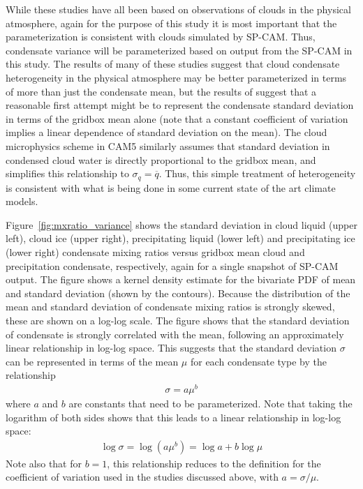While these studies have all been based on observations of clouds in the
physical atmosphere, again for the purpose of this study it is most
important that the parameterization is consistent with clouds simulated
by SP-CAM. Thus, condensate variance will be parameterized based on
output from the SP-CAM in this study. The results of many of these
studies suggest that cloud condensate heterogeneity in the physical
atmosphere may be better parameterized in terms of more than just the
condensate mean, but the results of \citet{shonk_et_al_2010} suggest
that a reasonable first attempt might be to represent the condensate
standard deviation in terms of the gridbox mean alone (note that a
constant coefficient of variation implies a linear dependence of
standard deviation on the mean). The cloud microphysics scheme in CAM5
similarly assumes that standard deviation in condensed cloud water is
directly proportional to the gridbox mean, and simplifies this
relationship to \(\sigma_q = \overline{q}\). Thus, this simple treatment
of heterogeneity is consistent with what is being done in some current
state of the art climate models.

Figure~\ref{fig:mxratio_variance} shows the standard deviation in cloud
liquid (upper left), cloud ice (upper right), precipitating liquid
(lower left) and precipitating ice (lower right) condensate mixing
ratios versus gridbox mean cloud and precipitation condensate,
respectively, again for a single snapshot of SP-CAM output. The figure
shows a kernel density estimate for the bivariate PDF of mean and
standard deviation (shown by the contours). Because the distribution of
the mean and standard deviation of condensate mixing ratios is strongly
skewed, these are shown on a log-log scale. The figure shows that the
standard deviation of condensate is strongly correlated with the mean,
following an approximately linear relationship in log-log space. This
suggests that the standard deviation \(\sigma\) can be represented in
terms of the mean \(\mu\) for each condensate type by the relationship
\begin{equation}\begin{gathered}
    \sigma = a \mu^b
\end{gathered}\label{eq:sigmaMu}\end{equation} where \(a\) and \(b\) are
constants that need to be parameterized. Note that taking the logarithm
of both sides shows that this leads to a linear relationship in log-log
space: \[\begin{gathered} 
    \log \sigma = \log(a \mu^b) = \log a + b\log \mu
\end{gathered}\] Note also that for \(b = 1\), this relationship reduces
to the definition for the coefficient of variation used in the studies
discussed above, with \(a = \sigma / \mu\).

